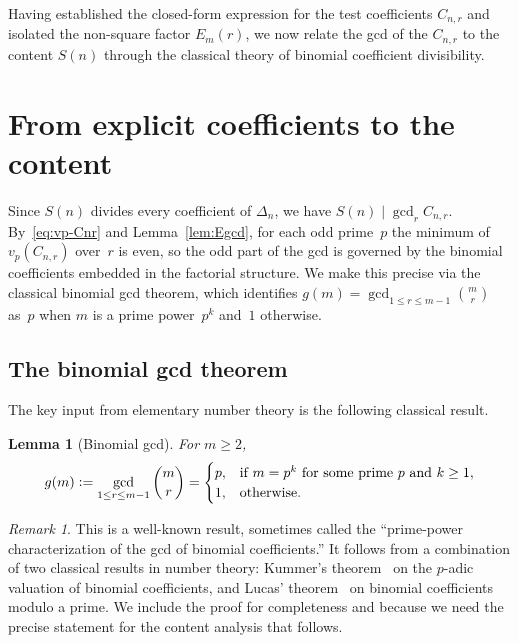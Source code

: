 \documentclass[10pt]{amsart}
\newtheorem{lemma}[theorem]{Lemma}
\theoremstyle{definition}
\theoremstyle{remark}
\newtheorem*{remark}{Remark}
\newcommand{\defeq}{\vcentcolon=}
\begin{document}
Having established the closed-form expression for the test coefficients
$C_{n,r}$ and isolated the non-square factor $E_m(r)$, we now relate
the gcd of the $C_{n,r}$ to the content $S(n)$ through the classical theory
of binomial coefficient divisibility.

\section{From explicit coefficients to the content}\label{sec:content}

Since $S(n)$ divides every coefficient of $\Delta_n$, we have
$S(n) \mid \gcd_{r} C_{n,r}$.  By~\eqref{eq:vp-Cnr} and
Lemma~\ref{lem:Egcd}, for each odd prime~$p$ the minimum of
$v_p(C_{n,r})$ over~$r$ is even, so the odd part of the gcd is governed
by the binomial coefficients embedded in the factorial structure.
We make this precise via the classical binomial gcd theorem, which
identifies $g(m) = \gcd_{1 \le r \le m-1} \binom{m}{r}$ as~$p$
when $m$ is a prime power~$p^k$ and~$1$ otherwise.

\subsection{The binomial gcd theorem}

The key input from elementary number theory is the following classical result.

\begin{lemma}[Binomial gcd]\label{lem:bingcd}
For $m \ge 2$,
\[
g(m) \defeq \gcd_{1 \le r \le m-1} \binom{m}{r}
= \begin{cases}
p, & \text{if } m = p^k \text{ for some prime } p \text{ and } k \ge 1,\\
1, & \text{otherwise.}
\end{cases}
\]
\end{lemma}

\begin{remark}
This is a well-known result, sometimes called the ``prime-power
characterization of the gcd of binomial coefficients.''  It follows from
a combination of two classical results in number theory: Kummer's
theorem~\cite{Kummer1852} on the $p$-adic valuation of binomial
coefficients, and Lucas' theorem~\cite{Lucas1878} on binomial coefficients
modulo a prime.  We include the proof for completeness and because we need
the precise statement for the content analysis that follows.
\end{remark}
\end{document}
